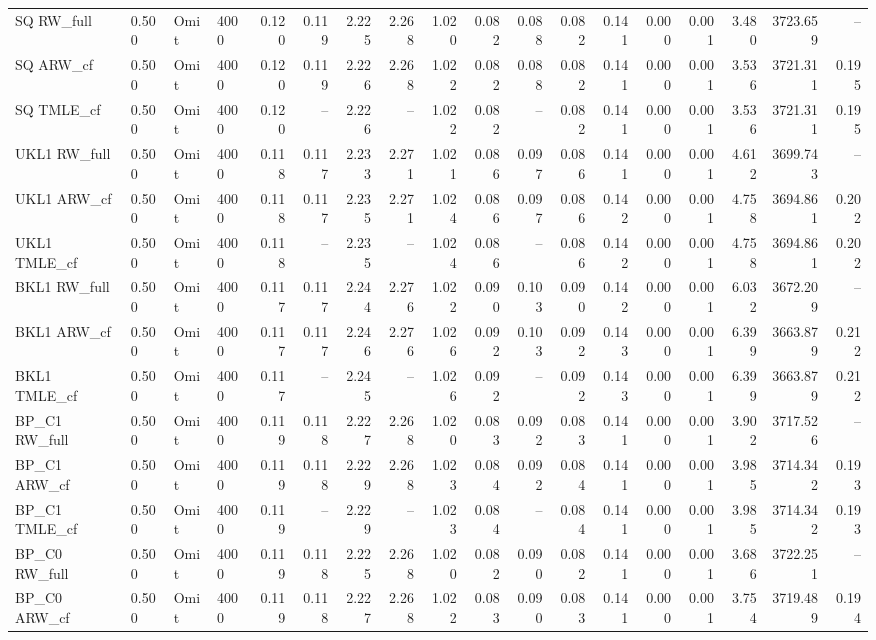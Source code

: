 \begin{tabular}{llllrrrrrrrrrrrrrr}
SQ RW\_full & 0.500 & Omit & 4000 & 0.120 & 0.119 & 2.225 & 2.268 & 1.020 & 0.082 & 0.088 & 0.082 & 0.141 & 0.000 & 0.001 & 3.480 & 3723.659 & -- \\
SQ ARW\_cf & 0.500 & Omit & 4000 & 0.120 & 0.119 & 2.226 & 2.268 & 1.022 & 0.082 & 0.088 & 0.082 & 0.141 & 0.000 & 0.001 & 3.536 & 3721.311 & 0.195 \\
SQ TMLE\_cf & 0.500 & Omit & 4000 & 0.120 & -- & 2.226 & -- & 1.022 & 0.082 & -- & 0.082 & 0.141 & 0.000 & 0.001 & 3.536 & 3721.311 & 0.195 \\
UKL1 RW\_full & 0.500 & Omit & 4000 & 0.118 & 0.117 & 2.233 & 2.271 & 1.021 & 0.086 & 0.097 & 0.086 & 0.141 & 0.000 & 0.001 & 4.612 & 3699.743 & -- \\
UKL1 ARW\_cf & 0.500 & Omit & 4000 & 0.118 & 0.117 & 2.235 & 2.271 & 1.024 & 0.086 & 0.097 & 0.086 & 0.142 & 0.000 & 0.001 & 4.758 & 3694.861 & 0.202 \\
UKL1 TMLE\_cf & 0.500 & Omit & 4000 & 0.118 & -- & 2.235 & -- & 1.024 & 0.086 & -- & 0.086 & 0.142 & 0.000 & 0.001 & 4.758 & 3694.861 & 0.202 \\
BKL1 RW\_full & 0.500 & Omit & 4000 & 0.117 & 0.117 & 2.244 & 2.276 & 1.022 & 0.090 & 0.103 & 0.090 & 0.142 & 0.000 & 0.001 & 6.032 & 3672.209 & -- \\
BKL1 ARW\_cf & 0.500 & Omit & 4000 & 0.117 & 0.117 & 2.246 & 2.276 & 1.026 & 0.092 & 0.103 & 0.092 & 0.143 & 0.000 & 0.001 & 6.399 & 3663.879 & 0.212 \\
BKL1 TMLE\_cf & 0.500 & Omit & 4000 & 0.117 & -- & 2.245 & -- & 1.026 & 0.092 & -- & 0.092 & 0.143 & 0.000 & 0.001 & 6.399 & 3663.879 & 0.212 \\
BP\_C1 RW\_full & 0.500 & Omit & 4000 & 0.119 & 0.118 & 2.227 & 2.268 & 1.020 & 0.083 & 0.092 & 0.083 & 0.141 & 0.000 & 0.001 & 3.902 & 3717.526 & -- \\
BP\_C1 ARW\_cf & 0.500 & Omit & 4000 & 0.119 & 0.118 & 2.229 & 2.268 & 1.023 & 0.084 & 0.092 & 0.084 & 0.141 & 0.000 & 0.001 & 3.985 & 3714.342 & 0.193 \\
BP\_C1 TMLE\_cf & 0.500 & Omit & 4000 & 0.119 & -- & 2.229 & -- & 1.023 & 0.084 & -- & 0.084 & 0.141 & 0.000 & 0.001 & 3.985 & 3714.342 & 0.193 \\
BP\_C0 RW\_full & 0.500 & Omit & 4000 & 0.119 & 0.118 & 2.225 & 2.268 & 1.020 & 0.082 & 0.090 & 0.082 & 0.141 & 0.000 & 0.001 & 3.686 & 3722.251 & -- \\
BP\_C0 ARW\_cf & 0.500 & Omit & 4000 & 0.119 & 0.118 & 2.227 & 2.268 & 1.022 & 0.083 & 0.090 & 0.083 & 0.141 & 0.000 & 0.001 & 3.754 & 3719.489 & 0.194 \\

\end{tabular}
